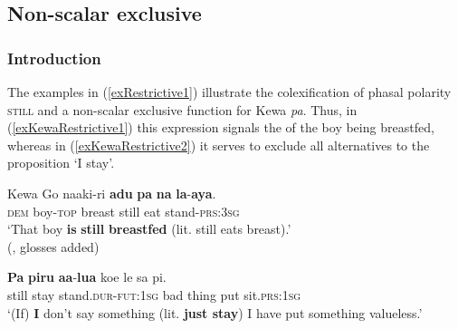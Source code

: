 \subsection{Non-scalar exclusive}
\label{sectionExclusive}
\subsubsection{Introduction}
The examples in (\ref{exRestrictive1}) illustrate the colexification of phasal polarity \textsc{still} and a non-scalar exclusive function for Kewa \textit{pa}. Thus, in (\ref{exKewaRestrictive1}) this expression signals the  of the boy being breastfed, whereas in  (\ref{exKewaRestrictive2}) it serves to exclude all alternatives to the proposition \lq I stay'.

\begin{exe}
\ex  \label{exRestrictive1}
	\begin{xlist}
		\exi{}Kewa
		\ex\label{exKewaRestrictive1}
		 \gll Go naaki-ri \textbf{adu} \textbf{pa} \textbf{na} \textbf{la}-\textbf{aya}.\\
	\textsc{dem} boy-\textsc{top} breast still eat stand-\textsc{prs}:3\textsc{sg}\\
		\glt \lq That boy \textbf{is} \textbf{still} \textbf{breastfed} (lit. still eats breast).'
		\\(\cite[7]{Franklin2007}, glosses added)	
	
		\ex\label{exKewaRestrictive2}
		\gll \textbf{Pa} \textbf{piru} \textbf{aa}-\textbf{lua} koe le sa pi.\\
	still stay stand.\textsc{dur}-\textsc{fut}:1\textsc{sg} bad thing put sit.\textsc{prs}:1\textsc{sg}\\
		\glt \lq (If) \textbf{I} don’t say something (lit. \textbf{just stay}) I have put something valueless.' \parencite[311–312]{Yarapea2006}
	\end{xlist}
\end{exe}
